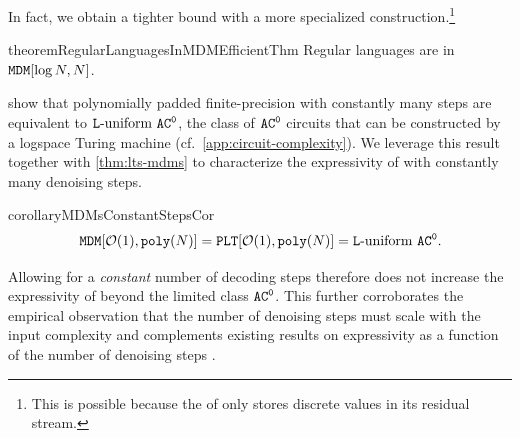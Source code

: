 \documentclass{article} %
\begin{document}
In fact, we obtain a tighter bound with a more specialized construction.\footnote{This is possible because the \LTAcr of \cite{saunshi2025reasoninglatentthoughtspower} only stores discrete values in its residual stream.}
\begin{restatable}{theorem}{RegularLanguagesInMDMEfficientThm} \label{thm:regular-languages-in-mdm-efficient}
   Regular languages are in ${\mathtt{MDM}}[\log{{N}}, {{N}}]$.
\end{restatable}

\citet{london2025pausetokensstrictlyincrease} show that polynomially padded finite-precision \LTsAcr with constantly many steps are equivalent to ${{\mathtt{L}}\textnormal{-uniform}} \ {{{{{{\mathtt{AC}}}^{\mathtt{0}}}}}}$, the class of ${{{{{{\mathtt{AC}}}^{\mathtt{0}}}}}}$ circuits that can be constructed by a logspace Turing machine (cf.~\cref{app:circuit-complexity}). 
We leverage this result together with \cref{thm:lts-mdms} to characterize the expressivity of \MDMsAcr with constantly many denoising steps.
\begin{restatable}{corollary}{MDMsConstantStepsCor} \label{cor:mdms-with-constant-steps}
   \begin{equation}
      \MDMClassEdit[\bigOFun{1}, \polyFun{\strlen}] = \LTClass[\bigOFun{1}, \polyFun{\strlen}] = \LUniform \ \ACZero.
   \end{equation}
\end{restatable}
Allowing for a \emph{constant} number of decoding steps therefore does not increase the expressivity of \MDMsAcr beyond the limited class ${{{{{{\mathtt{AC}}}^{\mathtt{0}}}}}}$.
This further corroborates the empirical observation that the number of denoising steps must scale with the input complexity and complements existing results on \MDMAcr expressivity as a function of the number of denoising steps \citep{li2025convergencetheorydiffusionlanguage,feng2025theoreticalbenefitlimitationdiffusion}.
\end{document}
